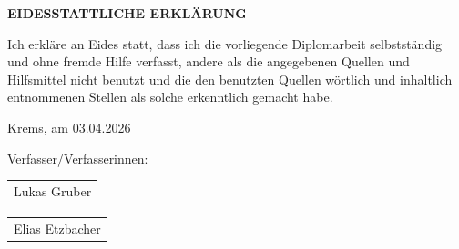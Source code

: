 \vspace*{2cm}
\begin{center}
\textbf{EIDESSTATTLICHE ERKLÄRUNG}
\end{center}
\begin{center}
\begin{minipage}[c]{9cm}
	Ich erkläre an Eides statt, dass ich die vorliegende Diplomarbeit selbstständig und ohne fremde Hilfe verfasst, andere als die angegebenen Quellen und Hilfsmittel nicht benutzt und die den benutzten Quellen wörtlich und inhaltlich entnommenen Stellen als solche erkenntlich gemacht habe.
\end{minipage}
\end{center}

\vspace{3cm}
\begin{minipage}[t]{8cm}
\vspace{0pt}
\begin{flushleft}
Krems, am 03.04.2026
\vspace*{0.5cm}
\end{flushleft}
\end{minipage}
\hfill
\begin{minipage}[t]{8cm}
\vspace{0pt}
\begin{flushright}
Verfasser/Verfasserinnen:\\
\vspace*{2.5cm}
\hspace{1cm}

\hspace*{\fill}\begin{tabular}{@{}>{\centering\arraybackslash}p{4cm}@{}}
\toprule
\vspace{0.1cm}
Lukas Gruber
\end{tabular}

\vspace*{3cm}

\hspace*{\fill}\begin{tabular}{@{}>{\centering\arraybackslash}p{4cm}@{}}
\toprule
\vspace{0.1cm}
Elias Etzbacher
\end{tabular}

\end{flushright}
\vspace*{1.5cm}
\end{minipage}